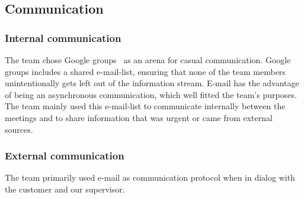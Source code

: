 \subsection{Communication}
\subsubsection{Internal communication}
The team chose Google groups~\cite{ggroups} as an arena for casual communication. Google groups includes a shared e-mail-list, ensuring that none of the team members unintentionally gets left out of the information stream. E-mail has the advantage of being an asynchronous communication, which well fitted the team's purposes. The team mainly used this e-mail-list to communicate internally between the meetings and to share information that was urgent or came from external sources. 

\subsubsection{External communication}
The team primarily used e-mail as communication protocol when in dialog with the customer and our supervisor.